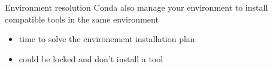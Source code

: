 \begin{frame}{Environment resolution}
Conda also manage your environment to install compatible tools in the same environment
\begin{itemize}[<2->]
\item time to solve the environement installation plan
\item could be locked and don't install a tool
\end{itemize}
\end{frame}

